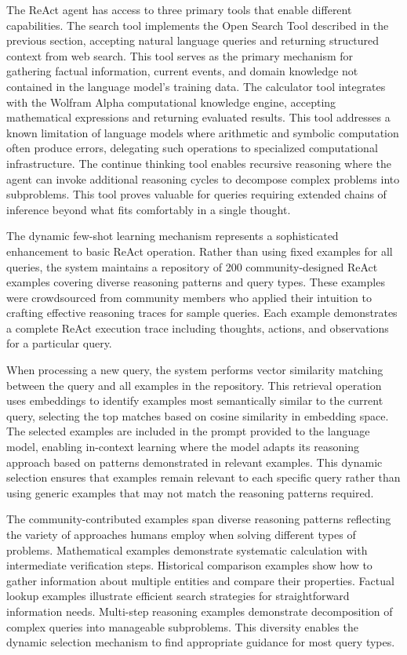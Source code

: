 The ReAct agent has access to three primary tools that enable different capabilities. The search tool implements the Open Search Tool described in the previous section, accepting natural language queries and returning structured context from web search. This tool serves as the primary mechanism for gathering factual information, current events, and domain knowledge not contained in the language model's training data. The calculator tool integrates with the Wolfram Alpha computational knowledge engine, accepting mathematical expressions and returning evaluated results. This tool addresses a known limitation of language models where arithmetic and symbolic computation often produce errors, delegating such operations to specialized computational infrastructure. The continue thinking tool enables recursive reasoning where the agent can invoke additional reasoning cycles to decompose complex problems into subproblems. This tool proves valuable for queries requiring extended chains of inference beyond what fits comfortably in a single thought.

The dynamic few-shot learning mechanism represents a sophisticated enhancement to basic ReAct operation. Rather than using fixed examples for all queries, the system maintains a repository of 200 community-designed ReAct examples covering diverse reasoning patterns and query types. These examples were crowdsourced from community members who applied their intuition to crafting effective reasoning traces for sample queries. Each example demonstrates a complete ReAct execution trace including thoughts, actions, and observations for a particular query.

When processing a new query, the system performs vector similarity matching between the query and all examples in the repository. This retrieval operation uses embeddings to identify examples most semantically similar to the current query, selecting the top matches based on cosine similarity in embedding space. The selected examples are included in the prompt provided to the language model, enabling in-context learning where the model adapts its reasoning approach based on patterns demonstrated in relevant examples. This dynamic selection ensures that examples remain relevant to each specific query rather than using generic examples that may not match the reasoning patterns required.

The community-contributed examples span diverse reasoning patterns reflecting the variety of approaches humans employ when solving different types of problems. Mathematical examples demonstrate systematic calculation with intermediate verification steps. Historical comparison examples show how to gather information about multiple entities and compare their properties. Factual lookup examples illustrate efficient search strategies for straightforward information needs. Multi-step reasoning examples demonstrate decomposition of complex queries into manageable subproblems. This diversity enables the dynamic selection mechanism to find appropriate guidance for most query types.

